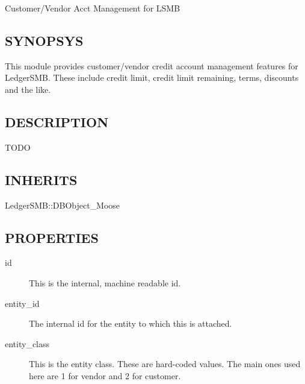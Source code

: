 \begin{description}
\begin{description}
\begin{description}
\begin{description}
\begin{description}
\begin{description}
\begin{description}
\begin{description}
Customer/Vendor Acct Management for LSMB

\subsection*{SYNOPSYS\label{LedgerSMB::DBObject::Entity::Credit_Account_SYNOPSYS}}


This module provides customer/vendor credit account management features for
LedgerSMB.  These include credit limit, credit limit remaining, terms, discounts
and the like.

\subsection*{DESCRIPTION\label{LedgerSMB::DBObject::Entity::Credit_Account_DESCRIPTION}}


TODO

\subsection*{INHERITS\label{LedgerSMB::DBObject::Entity::Credit_Account_INHERITS}}
\begin{description}

\item[{LedgerSMB::DBObject\_Moose}] \mbox{}\end{description}
\subsection*{PROPERTIES\label{LedgerSMB::DBObject::Entity::Credit_Account_PROPERTIES}}
\begin{description}

\item[{id}] \mbox{}

This is the internal, machine readable id.


\item[{entity\_id}] \mbox{}

The internal id for the entity to which this is attached.


\item[{entity\_class}] \mbox{}

This is the entity class.  These are hard-coded values.  The main ones used here
are 1 for vendor and 2 for customer.



\end{description}
\end{description}
\end{description}
\end{description}
\end{description}
\end{description}
\end{description}
\end{description}
\end{description}
